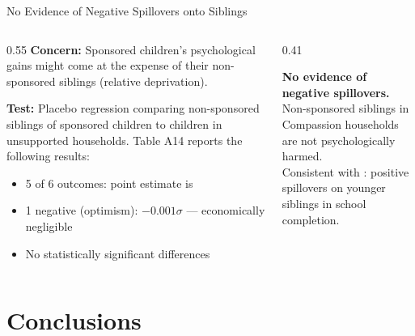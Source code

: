 \documentclass[aspectratio=169, 10pt]{beamer}
\begin{document}
\begin{frame}{No Evidence of Negative Spillovers onto Siblings}
  \begin{columns}
    \begin{column}{0.55\textwidth}
      \textbf{Concern:} Sponsored children's psychological gains might come at the expense of their non-sponsored siblings (relative deprivation).

      \vspace{0.5em}
      \textbf{Test:} Placebo regression comparing non-sponsored siblings of sponsored children to children in unsupported households.
      \vspace{0.5em}
      Table A14 reports the following results:
      \begin{itemize}
        \item 5 of 6 outcomes: point estimate is 
        \item 1 negative (optimism): $-0.001\sigma$ --- economically negligible
        \item No statistically significant differences
      \end{itemize}
    \end{column}
    \begin{column}{0.41\textwidth}
      \begin{resultbox}
        \textbf{No evidence of negative spillovers.}\\[0.4em]
        Non-sponsored siblings in Compassion households are not psychologically harmed.\\[0.5em]
        Consistent with \citealt{Wydick2013}: positive spillovers on younger siblings in school completion.
      \end{resultbox}
    \end{column}
  \end{columns}
\end{frame}

\section{Conclusions}
\end{document}

